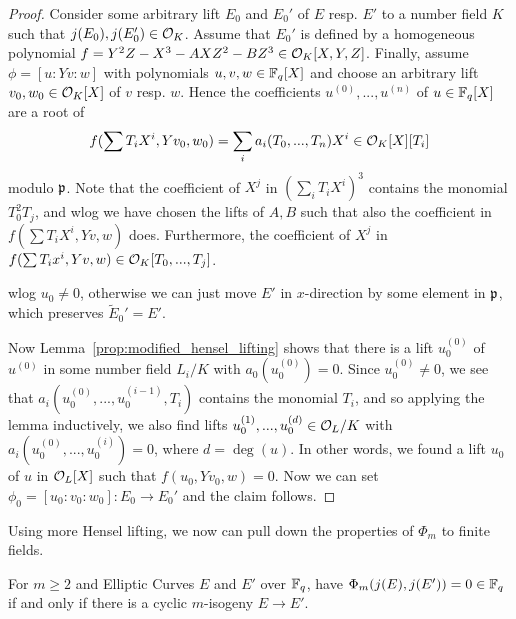 \begin{proof}
    Consider some arbitrary lift $E_0$ and $E_0'$ of $E$ resp. $E'$ to a number field $K$ such that $j(E_0), j(E_0') \in \mathcal{O}_K$.
    Assume that $E_0'$ is defined by a homogeneous polynomial $f = Y^2Z - X^3 - AXZ^2 - BZ^3 \in \mathcal{O}_K[X, Y, Z]$.
    Finally, assume $\phi = [u : Y v : w]$ with polynomials $u, v, w \in \mathbb{F}_q[X]$ and choose an arbitrary lift $v_0, w_0 \in \mathcal{O}_K[X]$ of $v$ resp. $w$.
    Hence the coefficients $u^{(0)}, ..., u^{(n)}$ of $u \in \mathbb{F}_q[X]$ are a root of
    \begin{equation*}
        f(\sum T_i X^i, Y v_0, w_0) = \sum_i a_i(T_0, ..., T_n) X^i \in \mathcal{O}_K[X][T_i]
    \end{equation*}
    modulo $\mathfrak{p}$.
    Note that the coefficient of $X^j$ in $(\sum_i T_i X^i)^3$ contains the monomial $T_0^2 T_j$, and wlog we have chosen the lifts of $A, B$ such that also the coefficient in $f(\sum T_i X^i, Y v, w)$ does.
    Furthermore, the coefficient of $X^j$ in $f(\sum T_i x^i, Y v, w) \in \mathcal{O}_K[T_0, ..., T_j]$.

    wlog $u_0 \neq 0$, otherwise we can just move $E'$ in $x$-direction by some element in $\mathfrak{p}$, which preserves $\tilde{E}_0' = E'$.

    Now Lemma~\ref{prop:modified_hensel_lifting} shows that there is a lift $u^{(0)}_0$ of $u^{(0)}$ in some number field $L_i/K$ with $a_0(u^{(0)}_0) = 0$.
    Since $u_0^{(0)} \neq 0$, we see that $a_i(u_0^{(0)}, ..., u_0^{(i - 1)}, T_i)$ contains the monomial $T_i$, and so applying the lemma inductively, we also find lifts $u^{(1)}_0, ..., u^{(d)}_0 \in \mathcal{O}_L/K$ with $a_i(u^{(0)}_0, ..., u^{(i)}_0) = 0$, where $d = \deg(u)$.
    In other words, we found a lift $u_0$ of $u$ in $\mathcal{O}_L[X]$ such that $f(u_0, Y v_0, w) = 0$.
    Now we can set $\phi_0 = [u_0 : v_0 : w_0]: E_0 \to E_0'$ and the claim follows.
\end{proof}
Using more Hensel lifting, we now can pull down the properties of $\Phi_m$ to finite fields.
\begin{prop}
    For $m \geq 2$ and Elliptic Curves $E$ and $E'$ over $\mathbb{F}_q$, have $\Phi_m(j(E), j(E')) = 0 \in \mathbb{F}_q$ if and only if there is a cyclic $m$-isogeny $E \to E'$.
\end{prop}
